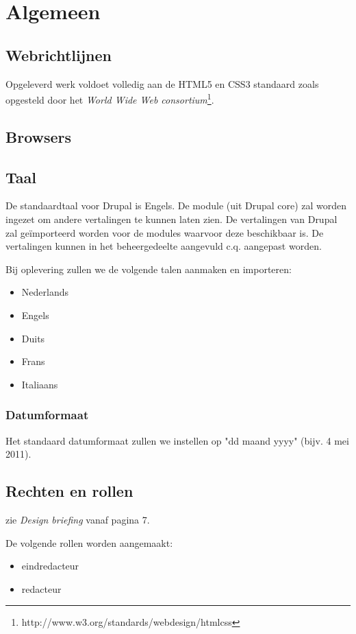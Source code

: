 \section{Algemeen}\label{algemeen}

\subsection{Webrichtlijnen}

Opgeleverd werk voldoet volledig aan de HTML5 en CSS3 standaard zoals opgesteld door het \emph{World Wide Web consortium}\footnote{http://www.w3.org/standards/webdesign/htmlcss}.

\subsection{Browsers}


\subsection{Taal}\label{taal}
De standaardtaal voor Drupal is Engels. De  module (uit Drupal core) zal worden ingezet om andere vertalingen te kunnen laten zien. De vertalingen van Drupal zal ge\"{i}mporteerd worden voor de modules waarvoor deze beschikbaar is. De vertalingen kunnen in het beheergedeelte aangevuld c.q. aangepast worden.

Bij oplevering zullen we de volgende talen aanmaken en importeren:
\begin{itemize}
\item Nederlands
\item Engels
\item Duits
\item Frans
\item Italiaans
\end{itemize}

\subsubsection{Datumformaat}
Het standaard datumformaat zullen we instellen op "dd maand yyyy" (bijv. 4 mei 2011).

\subsection{Rechten en rollen}\label{rollen}

zie \emph{Design briefing} vanaf pagina 7.

De volgende rollen worden aangemaakt:
\begin{itemize}
\item eindredacteur
\item redacteur
\end{itemize}


